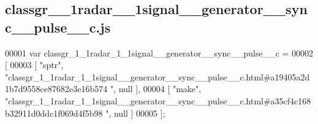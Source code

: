 \subsection{classgr\+\_\+\_\+1radar\+\_\+\_\+1signal\+\_\+\+\_\+generator\+\_\+\+\_\+sync\+\_\+\+\_\+pulse\+\_\+\+\_\+c.\+js}
\label{classgr__1__1radar__1__1signal____generator____sync____pulse____c_8js_source}

\begin{DoxyCode}
00001 var classgr_1_1radar_1_1signal__generator__sync__pulse__c =
00002 [
00003     [ \textcolor{stringliteral}{"sptr"}, \textcolor{stringliteral}{"classgr\_1\_1radar\_1\_1signal\_\_generator\_\_sync\_\_pulse\_\_c.html#a19405a2d1b7d9558ce87682e3e16b574
      "}, null ],
00004     [ \textcolor{stringliteral}{"make"}, \textcolor{stringliteral}{"classgr\_1\_1radar\_1\_1signal\_\_generator\_\_sync\_\_pulse\_\_c.html#a35cf4c168b32911d0ddc1f069d4f5b98
      "}, null ]
00005 ];
\end{DoxyCode}
